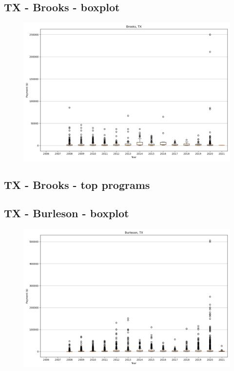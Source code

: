 \subsection*{TX - Brooks - boxplot}
\begin{figure}[h]
\centering
\includegraphics[width=7in]{../output/boxplots/counties/Brooks-TX_boxplot.png}
\end{figure}


\subsection*{TX - Brooks - top programs}

\newpage
\subsection*{TX - Burleson - boxplot}
\begin{figure}[h]
\centering
\includegraphics[width=7in]{../output/boxplots/counties/Burleson-TX_boxplot.png}
\end{figure}


